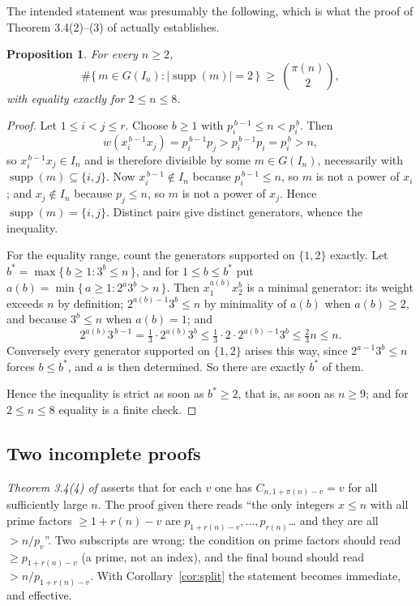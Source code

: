 \documentclass[a4paper,11pt,oneside,reqno]{amsart}
\theoremstyle{definition}
\theoremstyle{remark}
\theoremstyle{plain}
\newtheorem{proposition}[definition]{Proposition}
\begin{document}
The intended statement was presumably the following, which is what the proof of
Theorem 3.4(2)--(3) of \cite{Snellman2000} actually establishes.

\begin{proposition}\label{prop:fixed35}
  For every \(n \ge 2\),
  \[
    \#\{\,m \in G(I_n) : |\!\operatorname{supp}(m)|=2\,\}
      \ \ge \ \binom{\pi(n)}{2},
  \]
  with equality exactly for \(2 \le n \le 8\).
\end{proposition}

\begin{proof}
  Let \(1 \le i < j \le r\). Choose \(b \ge 1\) with \(p_i^{\,b-1} \le n < p_i^{\,b}\).
  Then
  \[
    w(x_i^{\,b-1}x_j) = p_i^{\,b-1}p_j > p_i^{\,b-1}p_i = p_i^{\,b} > n,
  \]
  so \(x_i^{\,b-1}x_j \in I_n\) and is therefore divisible by some
  \(m \in G(I_n)\), necessarily with \(\operatorname{supp}(m) \subseteq \{i,j\}\).
  Now \(x_i^{\,b-1} \notin I_n\) because \(p_i^{\,b-1} \le n\), so \(m\) is not a
  power of \(x_i\); and \(x_j \notin I_n\) because \(p_j \le n\), so \(m\) is not
  a power of \(x_j\). Hence \(\operatorname{supp}(m) = \{i,j\}\). Distinct pairs
  give distinct generators, whence the inequality.

  For the equality range, count the generators supported on \(\{1,2\}\)
  exactly. Let \(b^{*} = \max\{\,b \ge 1 : 3^{b} \le n\,\}\), and for
  \(1 \le b \le b^{*}\) put \(a(b) = \min\{\,a \ge 1 : 2^{a}3^{b} > n\,\}\). Then
  \(x_1^{a(b)}x_2^{b}\) is a minimal generator: its weight exceeds \(n\) by
  definition; \(2^{a(b)-1}3^{b} \le n\) by minimality of \(a(b)\) when
  \(a(b) \ge 2\), and because \(3^{b} \le n\) when \(a(b) = 1\); and
  \[
    2^{a(b)}3^{\,b-1} = \tfrac{1}{3} \cdot 2^{a(b)}3^{b}
      \le \tfrac{1}{3} \cdot 2 \cdot 2^{a(b)-1}3^{b} \le \tfrac{2}{3}n \le n .
  \]
  Conversely every generator supported on \(\{1,2\}\) arises this way, since
  \(2^{a-1}3^{b} \le n\) forces \(b \le b^{*}\), and \(a\) is then determined.
  So there are exactly \(b^{*}\) of them.

  Hence the inequality is strict as soon as \(b^{*} \ge 2\), that is, as soon as
  \(n \ge 9\); and for \(2 \le n \le 8\) equality is a finite check.
\end{proof}

\subsection{Two incomplete proofs}

\emph{Theorem 3.4(4) of \cite{Snellman2000}} asserts that for each \(v\) one has
\(C_{n,1+\pi(n)-v} = v\) for all sufficiently large \(n\). The proof given there
reads ``the only integers \(x \le n\) with all prime factors \(\ge 1+r(n)-v\) are
\(p_{1+r(n)-v},\dots,p_{r(n)}\)\dots{} and they are all \(>n/p_v\)''. Two
subscripts are wrong: the condition on prime factors should read
\(\ge p_{1+r(n)-v}\) (a prime, not an index), and the final bound should read
\(>n/p_{1+r(n)-v}\). With Corollary~\ref{cor:split} the statement becomes
immediate, and effective.
\end{document}

